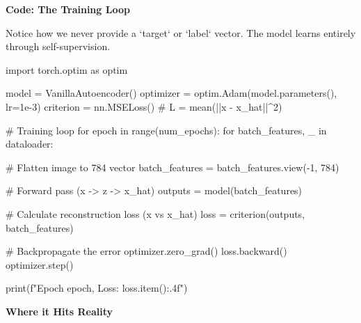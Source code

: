 \documentclass[11pt]{article}
\begin{document}
\newpage


\vspace*{0.2in}

\begin{center}
{\Large\bfseries Code: The Training Loop}
\end{center}

\vspace{0.1in}

Notice how we never provide a `target` or `label` vector. The model learns entirely through self-supervision.

\vspace{0.1in}

\begin{codebox}[train.py]
import torch.optim as optim

model = VanillaAutoencoder()
optimizer = optim.Adam(model.parameters(), lr=1e-3)
criterion = nn.MSELoss() # L = mean(||x - x_hat||^2)

# Training loop
for epoch in range(num_epochs):
    for batch_features, _ in dataloader:
        
        # Flatten image to 784 vector
        batch_features = batch_features.view(-1, 784)
        
        # Forward pass (x -> z -> x_hat)
        outputs = model(batch_features)
        
        # Calculate reconstruction loss (x vs x_hat)
        loss = criterion(outputs, batch_features)
        
        # Backpropagate the error
        optimizer.zero_grad()
        loss.backward()
        optimizer.step()
        
    print(f"Epoch {epoch}, Loss: {loss.item():.4f}")
\end{codebox}

\newpage


\vspace*{0.8in}

\begin{center}
{\fontsize{26}{30}\selectfont\color{brandnavy}\bfseries Where it Hits Reality}
\end{center}
\end{document}
